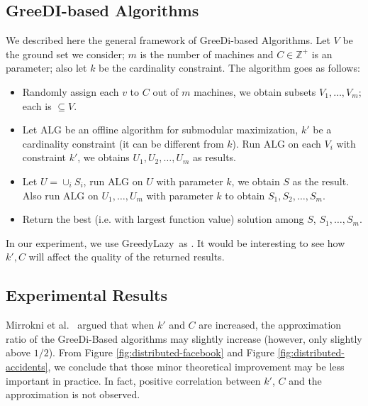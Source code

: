 \documentclass[11pt]{article}
\newcommand{\bbZ}{\mathbb{Z}}
\newcommand{\alg}{\text{ALG}}
\newcommand{\greedyLazy}{{\sc GreedyLazy}~}
\begin{document}
\subsection{{\sc GreeDI}-based Algorithms}
We described here the general framework of {\sc GreeDi}-based Algorithms. Let $V$ be the ground set we consider; $m$ is the number of machines and $C \in \bbZ^+$ is an parameter; also let $k$ be the cardinality constraint. The algorithm goes as follows:
\begin{itemize}
\item Randomly assign each $v$ to $C$ out of $m$ machines, we obtain subsets $V_1, \ldots, V_m$; each is $\subseteq  V$.
\item Let $\alg$ be an offline algorithm for submodular maximization, $k'$ be a cardinality constraint (it can be different from $k$). Run $\alg$ on each $V_i$ with constraint $k'$, we obtains $U_1, U_2, \ldots, U_m$ as results.
\item Let $U = \cup_i S_i$, run $\alg$ on $U$ with parameter $k$, we obtain $S$ as the result. Also run $\alg$ on $U_1, \ldots, U_m$ with parameter $k$ to obtain $S_1, S_2, \ldots, S_m$.
\item Return the best (i.e. with largest function value) solution among $S$, $S_1, \ldots, S_m$.
\end{itemize}

In our experiment, we use \greedyLazy as \alg. It would  be interesting to see how $k', C$ will affect the quality of the returned results.

\subsection{Experimental Results}
Mirrokni et al.\ \cite{MZ15} argued that when $k'$ and $C$ are increased, the approximation ratio of the {\sc GreeDi}-Based algorithms may slightly increase (however, only slightly above $1/2$). From Figure \ref{fig:distributed-facebook} and Figure \ref{fig:distributed-accidents}, we conclude that those minor theoretical improvement may be less important in practice. In fact, positive correlation between $k'$, $C$ and the approximation is not observed.  
\begin{figure*}[h!]
     \centering
     ~~
     \caption{{\sc GreeDi}-based Algorithms on {\sc Facebook} dataset.}
     \label{fig:distributed-facebook}
\end{figure*}
\end{document}
